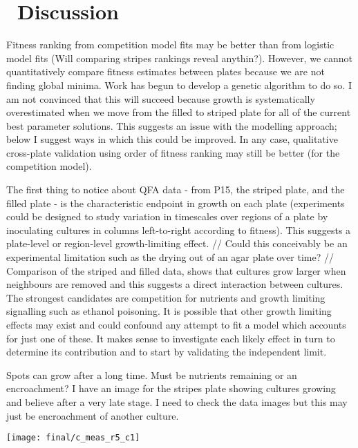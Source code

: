 \graphicspath{{images/}}

\section{\thesection~Discussion}
\label{sec:discussion}

Fitness ranking from competition model fits may be better than from
logistic model fits (Will comparing stripes rankings reveal
anythin?). However, we cannot quantitatively compare fitness estimates
between plates because we are not finding global minima. Work has
begun to develop a genetic algorithm to do so. I am not convinced that
this will succeed because growth is systematically overestimated when
we move from the filled to striped plate for all of the current best
parameter solutions. This suggests an issue with the modelling
approach; below I suggest ways in which this could be improved. In
any case, qualitative cross-plate validation using order of fitness
ranking may still be better (for the competition model).

The first thing to notice about QFA data - from P15, the striped
plate, and the filled plate - is the characteristic endpoint in growth
on each plate (experiments could be designed to study variation in
timescales over regions of a plate by inoculating cultures in columns
left-to-right according to fitness). This suggests a plate-level or
region-level growth-limiting effect.
//
Could this conceivably be an experimental limitation such as the
drying out of an agar plate over time?
//
Comparison of the striped and filled data, shows that cultures grow
larger when neighbours are removed and this suggests a direct
interaction between cultures. The strongest candidates are competition
for nutrients and growth limiting signalling such as ethanol
poisoning. It is possible that other growth limiting effects may exist
and could confound any attempt to fit a model which accounts for just
one of these. It makes sense to investigate each likely effect in turn
to determine its contribution and to start by validating the
independent limit.


Spots can grow after a long time. Must be nutrients remaining or an
encroachment? I have an image for the stripes plate showing cultures
growing and believe after a very late stage. I need to check the data
images but this may just be encroachment of another culture.
\graphicspath{{images/stripes/}}
\begin{Figure}
  \centering
  \texttt{[image: final/c\_meas\_r5\_c1]}
  \label{fig:kn_guessing}
\end{Figure}


